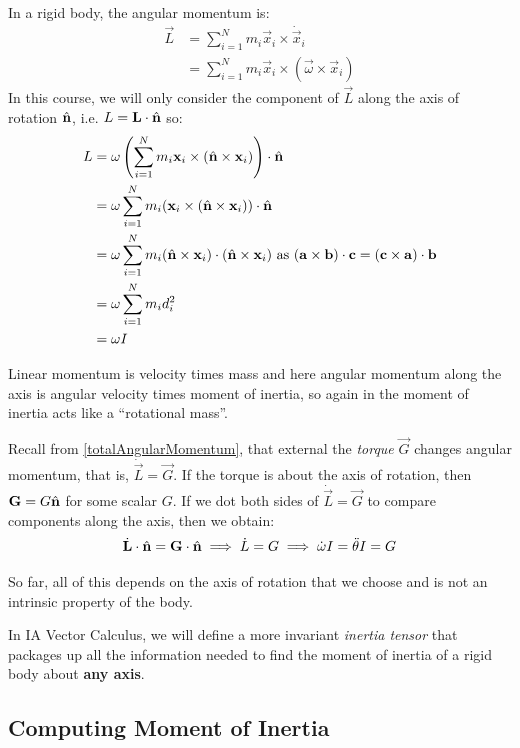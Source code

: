 \documentclass[../main.tex]{subfiles}
\begin{document}
In a rigid body, the angular momentum is:
\begin{align*}
  \vec{L} &= \sum_{i = 1}^{N} m_i \vec{x}_i \times \dot{\vec{x}}_i \\
          &= \sum_{i = 1}^{N} m_i \vec{x}_i \times (\vec{\omega} \times \vec{x}_i)
\end{align*}
In this course, we will only consider the component of $\vec{L}$ along the axis of rotation $\hat{\mathbf{\bm{n}}}$, i.e. $L = \mathbf{\bm{L}} \cdot \hat{\mathbf{\bm{n}}}$ so:
\begin{align*}
  L &= \omega \left(\sum_{i = 1}^{N} m_i \mathbf{\bm{x}}_i \times (\hat{\mathbf{\bm{n}}} \times \mathbf{\bm{x}}_i)\right) \cdot \hat{\mathbf{\bm{n}}} \\
    &= \omega \sum_{i = 1}^{N} m_i (\mathbf{\bm{x}}_i \times (\hat{\mathbf{\bm{n}}} \times \mathbf{\bm{x}}_i)) \cdot \hat{\mathbf{\bm{n}}} \\
    &= \omega \sum_{i = 1}^{N} m_i (\hat{\mathbf{\bm{n}}} \times \mathbf{\bm{x}}_i) \cdot (\hat{\mathbf{\bm{n}}} \times \mathbf{\bm{x}}_i) \text{ as $(\mathbf{\bm{a}} \times \mathbf{\bm{b}}) \cdot \mathbf{\bm{c}} = (\mathbf{\bm{c}} \times \mathbf{\bm{a}}) \cdot \mathbf{\bm{b}}$} \\
    &= \omega \sum_{i = 1}^{N} m_i d^2_i \\
    &= \omega I
\end{align*}
\begin{remark}
  Linear momentum is velocity times mass and here angular momentum along the axis is angular velocity times moment of inertia, so again in the moment of inertia acts like a ``rotational mass''.
\end{remark}
Recall from \cref{totalAngularMomentum}, that external the \textit{torque} $\vec{G}$ changes angular momentum, that is, $\dot{\vec{L}} = \vec{G}$.
If the torque is about the axis of rotation, then $\mathbf{\bm{G}} = G\hat{\mathbf{\bm{n}}}$ for some scalar $G$.
If we dot both sides of $\dot{\vec{L}} = \vec{G}$  to compare components along the axis, then we obtain:
\begin{equation}
  \dot{\mathbf{\bm{L}}} \cdot \hat{\mathbf{\bm{n}}} = \mathbf{\bm{G}} \cdot \hat{\mathbf{\bm{n}}} \implies \dot{L} = G \implies \dot{\omega}I = \ddot{\theta}I = G \label{torqueMomentOfInertia}
\end{equation}
\begin{remark}[Note]
  So far, all of this depends on the axis of rotation that we choose and is not an intrinsic property of the body.

  In IA Vector Calculus, we will define a more invariant \textit{inertia tensor} that packages up all the information needed to find the moment of inertia of a rigid body about \textbf{any axis}.
\end{remark}
\subsection{Computing Moment of Inertia}
\end{document}
